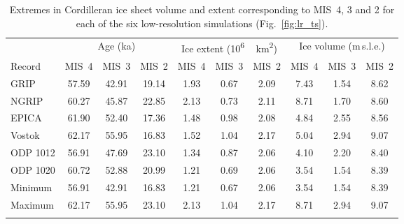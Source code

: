 \documentclass[tc, manuscript]{copernicus}
\begin{document}
\begin{table*}
\caption{%
      Extremes in Cordilleran ice sheet volume and extent corresponding to
      MIS~4, 3 and 2 for each of the six low-resolution simulations
      (Fig.~\ref{fig:lr_ts}).}
\label{tab:extrema}
{\begin{tabular}{l|ccc|ccc|ccc}
    \tophline
             & \multicolumn{3}{c|}{Age (ka)}
             & \multicolumn{3}{c|}{Ice extent (\unit{10^6\,km^2})}
             & \multicolumn{3}{c}{Ice volume (m\,s.l.e.)} \\
    Record   &  MIS~4 &  MIS~3 &  MIS~2
             &  MIS~4 &  MIS~3 &  MIS~2
             &  MIS~4 &  MIS~3 &  MIS~2 \\
    \middlehline
    GRIP     &  57.59 &  42.91 &  19.14
             &   1.93 &   0.67 &   2.09
             &   7.43 &   1.54 &   8.62 \\
    NGRIP    &  60.27 &  45.87 &  22.85
             &   2.13 &   0.73 &   2.11
             &   8.71 &   1.70 &   8.60 \\
    EPICA    &  61.90 &  52.40 &  17.36
             &   1.48 &   0.98 &   2.08
             &   4.84 &   2.55 &   8.56 \\
    Vostok   &  62.17 &  55.95 &  16.83
             &   1.52 &   1.04 &   2.17
             &   5.04 &   2.94 &   9.07 \\
    ODP 1012 &  56.91 &  47.69 &  23.10
             &   1.34 &   0.87 &   2.06
             &   4.10 &   2.20 &   8.40 \\
    ODP 1020 &  60.72 &  52.88 &  20.99
             &   1.21 &   0.69 &   2.06
             &   3.54 &   1.54 &   8.39 \\
    \cline{1-10}
    Minimum  &  56.91 &  42.91 &  16.83
             &   1.21 &   0.67 &   2.06
             &   3.54 &   1.54 &   8.39 \\
    Maximum  &  62.17 &  55.95 &  23.10
             &   2.13 &   1.04 &   2.17
             &   8.71 &   2.94 &   9.07 \\
    \bottomhline
\end{tabular}}
\end{table*}
\end{document}
